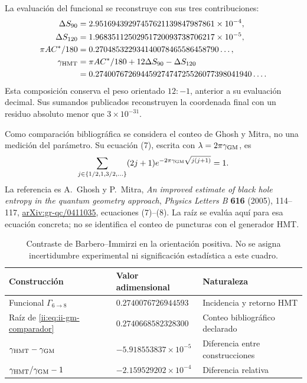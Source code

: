 La evaluación del funcional se reconstruye con sus tres contribuciones:
\begin{align*}
 \Delta S_{90}&=2.95169439297457621139847987861\times10^{-4},\\
 \Delta S_{120}&=1.96835112502951720093738706217\times10^{-5},\\
 \pi AC^*/180&=0.270485322934140078465586458790\ldots,\\
 \gamma_{\rm HMT}&=\pi AC^*/180+12\Delta S_{90}-\Delta S_{120}\\
 &=0.27400767269445927474725526077398041940\ldots.
\end{align*}
Esta composición conserva el peso orientado \(12:-1\), anterior a su
evaluación decimal. Sus sumandos publicados reconstruyen la coordenada
final con un residuo absoluto menor que \(3\times10^{-31}\).

Como comparación bibliográfica se considera el conteo de Ghosh y Mitra,
no una medición del parámetro. Su ecuación (7), escrita con
\(\lambda=2\pi\gamma_{\rm GM}\), es
\begin{equation}
 \sum_{j\in\{1/2,1,3/2,\ldots\}}(2j+1)
 e^{-2\pi\gamma_{\rm GM}\sqrt{j(j+1)}}=1.
 \label{ii:eq:ii-gm-comparador}
\end{equation}
La referencia es A.~Ghosh y P.~Mitra,
\emph{An improved estimate of black hole entropy in the quantum geometry
approach}, \emph{Physics Letters B} \textbf{616} (2005), 114--117,
\href{https://arxiv.org/abs/gr-qc/0411035}{arXiv:gr-qc/0411035},
ecuaciones (7)--(8). La raíz se evalúa aquí para esa ecuación concreta;
no se identifica el conteo de puncturas con el generador HMT.

\begin{table}[htbp]
\centering\small
\begin{tabular}{@{}lll@{}}
\toprule
Construcción & Valor adimensional & Naturaleza\\
\midrule
Funcional \(\Gamma_{6\to8}\) & \(0.2740076726944593\) & Incidencia y retorno HMT\\
Raíz de \eqref{ii:eq:ii-gm-comparador} & \(0.2740668582328300\) & Conteo bibliográfico declarado\\
\midrule
\(\gamma_{\rm HMT}-\gamma_{\rm GM}\) & \(-5.918553837\times10^{-5}\) & Diferencia entre construcciones\\
\(\gamma_{\rm HMT}/\gamma_{\rm GM}-1\) & \(-2.159529202\times10^{-4}\) & Diferencia relativa\\
\bottomrule
\end{tabular}
\caption{Contraste de Barbero--Immirzi en la orientación positiva. No se
asigna incertidumbre experimental ni significación estadística a este cuadro.}
\label{ii:tab:ii-barbero-comparacion}
\end{table}


